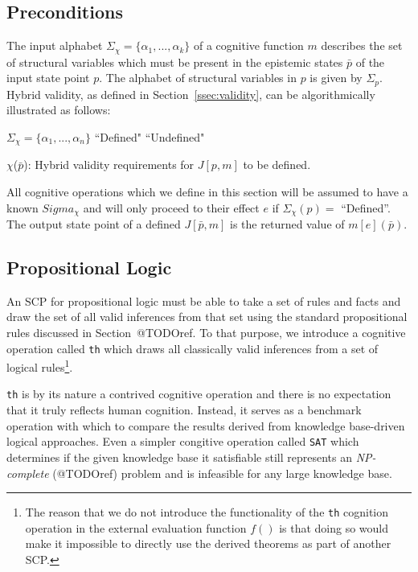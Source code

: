 \subsection{Preconditions}

The input alphabet $\Sigma_\chi=\{\alpha_1, ..., \alpha_k\}$ of a cognitive function $m$ describes the set of structural variables which must be present in the epistemic states $\bar{p}$ of the input state point $p$. The alphabet of structural variables in $p$ is given by $\Sigma_p$. Hybrid validity, as defined in Section~\ref{ssec:validity}, can be algorithmically illustrated as follows:

\begin{algorithm}[H] \label{cogOp:th}
\SetAlgoLined
{}
{
$\Sigma_{\chi}=\{\alpha_1,...,\alpha_n\}$\;
{
\Return ``Defined"
}
{
\Return ``Undefined"
}
}

\caption{$\chi$($\bar{p}$): Hybrid validity requirements for $J[p,m]$ to be defined.}
\end{algorithm}

All cognitive operations which we define in this section will be assumed to have a known $Sigma_\chi$ and will only proceed to their effect $e$ if $\Sigma_{\chi}(p)=$ ``Defined''.
The output state point of a defined $J[\bar{p},m]$ is the returned value of $m[e](\bar{p})$.

\subsection{Propositional Logic}
An SCP for propositional logic must be able to take a set of rules and facts and draw the set of all valid inferences from that set using the standard propositional rules discussed in Section~@TODOref. To that purpose, we introduce a cognitive operation called \texttt{th} which draws all classically valid inferences from a set of logical rules\footnote{The reason that we do not introduce the functionality of the \texttt{th} cognition operation in the external evaluation function $f()$ is that doing so would make it impossible to directly use the derived theorems as part of another SCP.}.

\texttt{th} is by its nature a contrived cognitive operation and there is no expectation that it truly reflects human cognition. Instead, it serves as a benchmark operation with which to compare the results derived from knowledge base-driven logical approaches. Even a simpler congitive operation called \texttt{SAT} which determines if the given knowledge base it satisfiable still represents an \textit{NP-complete} (@TODOref) problem and is infeasible for any large knowledge base.

